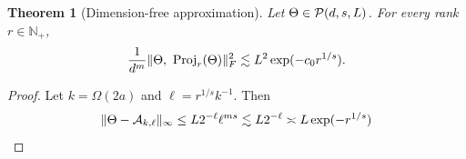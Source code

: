 \documentclass[11pt]{article}
\theoremstyle{plain}
\newtheorem{thm}{Theorem}[section]
\theoremstyle{definition}
\begin{document}
\begin{thm}[Dimension-free approximation] Let $\Theta\in\mathcal{P}(d,s,L)$. For every rank $r\in\mathbb{N}_{+}$,  
\[
{1\over d^m}\FnormSize{}{\Theta,\ \text{Proj}_r(\Theta)}^2\lesssim L^2\exp(-c_0r^{1/s}).
\]
\end{thm}
\begin{proof}
Let $k=\Omega(2a)$ and $\ell=r^{1/s}k^{-1}$. Then
\[
\lVert\Theta-\mathcal{A}_{k,\ell}\rVert_\infty\leq L 2^{-\ell}\ell^{ms} \lesssim L2^{-\ell}\asymp L\exp(-r^{1/s})
\]
\end{proof}
\end{document}
